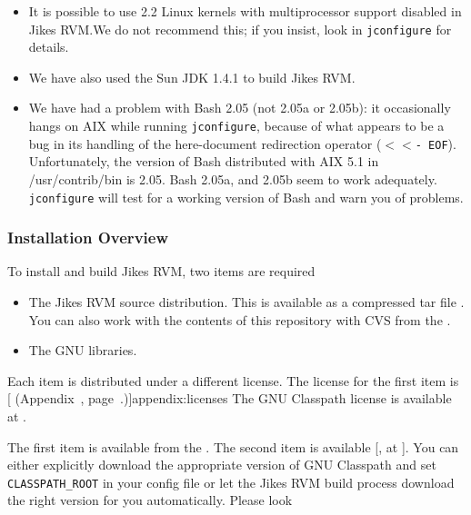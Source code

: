 \begin{itemize}
\item It is possible to use 2.2 Linux kernels with multiprocessor
support disabled in Jikes RVM.\@  We do not recommend this; if you
insist, look in \texttt{jconfigure} for details.
\item We have also used the Sun\Rweb{} JDK 1.4.1 to build Jikes RVM.\@

\item We have had a problem with Bash 2.05 (not
  2.05a or 2.05b): it occasionally hangs on AIX while running
  \texttt{jconfigure}, because of what appears to be a bug in its handling of
  the here-document redirection operator (\texttt{$<<$- EOF}).  Unfortunately, the
  version of Bash distributed with AIX 5.1 in /usr/contrib/bin is
  2.05.   Bash 2.05a, and 2.05b seem to work adequately.  
  \texttt{jconfigure} will test for a working version of Bash and warn
  you of problems.

\end{itemize}

\subsubsection{Installation Overview}\label{sec:installDetails}

To install and build Jikes\TMweb{} RVM, two items are required
\begin{itemize}
\item The Jikes RVM source distribution.  This is available as a
compressed tar file \texttt{\RVMTarFile}.  You can also work with the
contents of this repository with CVS from the 
.

\item The GNU 
 libraries. 
\end{itemize}

Each item is distributed under a different license.  The license for
the first item is [ (Appendix~\Ref, page~\Pageref.)]{appendix:licenses}
The GNU Classpath license is available at 
\xlink{\texttt{\classpathURL}}{\classpathURL}. 

The first item is available  from the . The second item is
available [, at \texttt{\classpathURL}]{\classpathURL}.
You can either explicitly download the appropriate version of GNU
Classpath and set \texttt{CLASSPATH\_ROOT} in your config file or let
the Jikes RVM build process download the right version for you
automatically.  Please look \AtManualClasspathRootDiscussion{}

